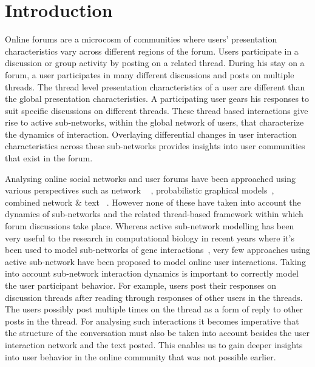 \documentclass{sig-alternate}
\begin{document}
\section{Introduction}
Online forums are a microcosm of communities where users' presentation
characteristics vary across different regions of the forum. Users participate in
a discussion or group activity by posting on a related thread. During his
stay on a forum, a user participates in many different discussions and posts on
multiple threads. The thread level presentation characteristics of a user are different
than the global presentation characteristics. A participating user gears his
responses to suit specific discussions on different threads. These thread based
interactions give rise to active sub-networks, within the global network of users,
that characterize the dynamics of interaction. Overlaying differential changes
in user interaction characteristics across these sub-networks provides
insights into user communities that exist in the forum. 

Analysing online social networks and user forums have been approached using
various perspectives such as network ~\cite{Shi:2000:NCI:351581.351611,
Shi00learningsegmentation} , probabilistic 
graphical models~\cite{ Airoldi:2008:MMS:1390681.1442798}, 
combined network \& text 
~\cite{Ho:2012:DHT:2187836.2187936,Nallapati:2008:JLT:1401890.1401957}. 
However none of these have taken
into account the dynamics of sub-networks and the related thread-based framework
within which forum discussions take place. Whereas
active sub-network modelling has been very useful to the research in
computational biology in recent years where it's been used to model sub-networks
of gene interactions~\cite{journals/ploscb/DeshpandeSVHM10,Lichtenstein:Charleston},
very few approaches using active sub-network have been proposed to model online
 user interactions. Taking into account sub-network interaction
dynamics is important to correctly model the user participant behavior. For
example, users post their
responses on discussion threads after reading through responses of
other users in the threads. The users possibly post multiple times on the thread
 as a form of reply to other posts in the thread. For analysing such
 interactions it becomes imperative that the structure of the conversation must also be taken
into account  besides the user interaction network and the
text posted. This enables us to gain deeper insights into user behavior in the
online community that was not possible earlier. 
\end{document}
